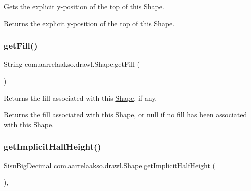 Gets the explicit y-\/position of the top of this \hyperlink{classcom_1_1aarrelaakso_1_1drawl_1_1_shape}{Shape}. 

\begin{DoxyReturn}{Returns}
the explicit y-\/position of the top of this \hyperlink{classcom_1_1aarrelaakso_1_1drawl_1_1_shape}{Shape}. 
\end{DoxyReturn}
\mbox{\label{classcom_1_1aarrelaakso_1_1drawl_1_1_shape_a0d9a33a3e151aaceeec140bea343a650}} 
\subsubsection{\texorpdfstring{get\+Fill()}{getFill()}}
{\footnotesize\ttfamily String com.\+aarrelaakso.\+drawl.\+Shape.\+get\+Fill (\begin{DoxyParamCaption}{ }\end{DoxyParamCaption})\hspace{0.3cm}{\ttfamily [inherited]}}



Returns the fill associated with this \hyperlink{classcom_1_1aarrelaakso_1_1drawl_1_1_shape}{Shape}, if any. 

\begin{DoxyReturn}{Returns}
the fill associated with this \hyperlink{classcom_1_1aarrelaakso_1_1drawl_1_1_shape}{Shape}, or null if no fill has been associated with this \hyperlink{classcom_1_1aarrelaakso_1_1drawl_1_1_shape}{Shape}. 
\end{DoxyReturn}
\mbox{\label{classcom_1_1aarrelaakso_1_1drawl_1_1_shape_a33908342a13df06645b6ab7c1fd7a801}} 
\subsubsection{\texorpdfstring{get\+Implicit\+Half\+Height()}{getImplicitHalfHeight()}}
{\footnotesize\ttfamily \hyperlink{classcom_1_1aarrelaakso_1_1drawl_1_1_sisu_big_decimal}{Sisu\+Big\+Decimal} com.\+aarrelaakso.\+drawl.\+Shape.\+get\+Implicit\+Half\+Height (\begin{DoxyParamCaption}{ }\end{DoxyParamCaption})\hspace{0.3cm}{\ttfamily [protected]}, {\ttfamily [inherited]}}

